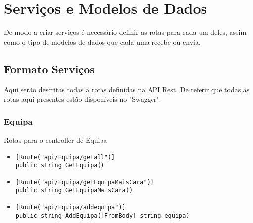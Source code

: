 \section{Serviços e Modelos de Dados}
De modo a criar serviços é necessário definir as rotas para cada um deles, assim como o tipo de modelos de dados que cada uma recebe ou envia.

\subsection{Formato Serviços}
Aqui serão descritas todas a rotas definidas na API Rest. De referir que todas as rotas aqui presentes estão disponíveis no "Swagger".
\vfill
\subsubsection{Equipa}
Rotas para o controller de Equipa
\begin{itemize}
    \item \begin{lstlisting}
[Route("api/Equipa/getall")] 
public string GetEquipa()
            \end{lstlisting}
\end{itemize}
\begin{itemize}
\item\begin{lstlisting}
[Route("api/Equipa/getEquipaMaisCara")]
public string GetEquipaMaisCara()
            \end{lstlisting}
\end{itemize}

\begin{itemize}
\item\begin{lstlisting}
[Route("api/Equipa/addequipa")] 
public string AddEquipa([FromBody] string equipa)
            \end{lstlisting}
\end{itemize}

